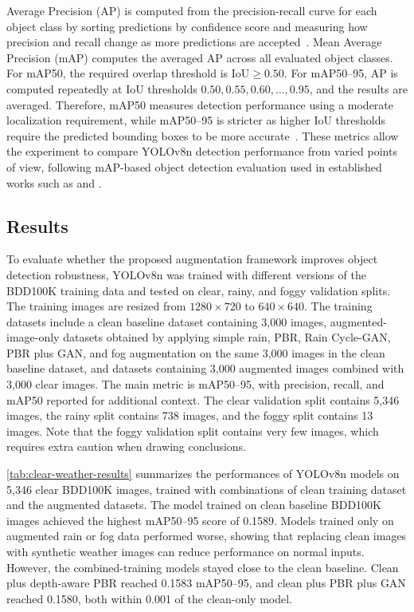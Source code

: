 \documentclass[10pt,letterpaper]{article}
\begin{document}
Average Precision (AP) is computed from the precision-recall curve for each object class by sorting predictions by confidence score and measuring how precision and recall change as more predictions are accepted~\cite{wangCWDETREfficientDetection2026}. 
Mean Average Precision (mAP) computes the averaged AP across all evaluated object classes. For mAP50, the required overlap threshold is $\text{IoU} \geq 0.50$. For mAP50--95, AP is computed repeatedly at IoU thresholds $0.50, 0.55, 0.60, \ldots, 0.95$, and the results are averaged. 
Therefore, mAP50 measures detection performance using a moderate localization requirement, while mAP50--95 is stricter as higher IoU thresholds require the predicted bounding boxes to be more accurate~\cite{ExploreUltralyticsYOLOv82023,WhatYOLOv8InDepth}. 
These metrics allow the experiment to compare YOLOv8n detection performance from varied points of view, following mAP-based object detection evaluation used in established works such as \textcite{tremblayRainRenderingEvaluating2021} and \textcite{mohamedDataEfficiencyStudy2026}.

\subsection{Results}

To evaluate whether the proposed augmentation framework improves object detection robustness, YOLOv8n was trained with different versions of the BDD100K training data and tested on clear, 
rainy, and foggy validation splits. The training images are resized from $1280\times720$ to $640\times640$. The training datasets include a clean baseline dataset containing 3,000 images, augmented-image-only datasets obtained by applying simple rain, PBR, Rain Cycle-GAN, PBR plus GAN, and fog augmentation
on the same 3,000 images in the clean baseline dataset, and datasets containing 3,000 augmented images combined with 3,000 clear images.
The main metric is mAP50--95, with precision, recall, and mAP50 reported for additional context. The clear validation split contains 5,346 images, 
the rainy split contains 738 images, and the foggy split contains 13 images. Note that the foggy validation split contains very few images, which requires extra caution when drawing conclusions.

\autoref{tab:clear-weather-results} summarizes the performances of YOLOv8n models on 5,346 clear BDD100K images, trained with combinations of clean training dataset and the augmented datasets. 
The model trained on clean baseline BDD100K images achieved the highest mAP50--95 score of 0.1589. Models trained only on augmented rain or fog data performed worse, showing that 
replacing clean images with synthetic weather images can reduce performance on normal inputs. However, the combined-training models stayed close to the clean baseline. 
Clean plus depth-aware PBR reached 0.1583 mAP50--95, and clean plus PBR plus GAN reached 0.1580, both within 0.001 of the clean-only model.
\end{document}

